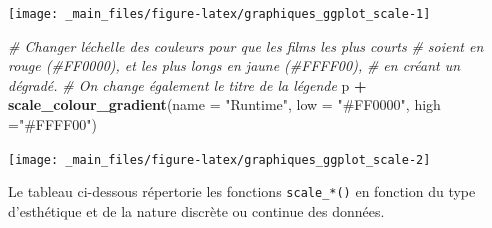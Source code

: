 \documentclass[
  11pt,
]{book}
\newenvironment{Shaded}{\begin{snugshade}}{\end{snugshade}}
\newcommand{\CommentTok}[1]{\textcolor[rgb]{0.56,0.35,0.01}{\textit{#1}}}
\newcommand{\DataTypeTok}[1]{\textcolor[rgb]{0.13,0.29,0.53}{#1}}
\newcommand{\KeywordTok}[1]{\textcolor[rgb]{0.13,0.29,0.53}{\textbf{#1}}}
\newcommand{\NormalTok}[1]{#1}
\newcommand{\OperatorTok}[1]{\textcolor[rgb]{0.81,0.36,0.00}{\textbf{#1}}}
\newcommand{\StringTok}[1]{\textcolor[rgb]{0.31,0.60,0.02}{#1}}
\numberwithin{equation}{section}
\numberwithin{countremarque}{section}
\begin{document}
\begin{center}\texttt{[image: \_main\_files/figure-latex/graphiques\_ggplot\_scale-1]} \end{center}

\begin{Shaded}
\begin{Highlighting}[]
\CommentTok{\# Changer l\textquotesingle{}échelle des couleurs pour que les films les plus courts}
\CommentTok{\# soient en rouge (\#FF0000), et les plus longs en jaune (\#FFFF00),}
\CommentTok{\# en créant un dégradé.}
\CommentTok{\# On change également le titre de la légende}
\NormalTok{p }\OperatorTok{+}\StringTok{ }\KeywordTok{scale\_colour\_gradient}\NormalTok{(}\DataTypeTok{name =} \StringTok{"Runtime"}\NormalTok{, }\DataTypeTok{low =} \StringTok{"\#FF0000"}\NormalTok{, }\DataTypeTok{high =}\StringTok{"\#FFFF00"}\NormalTok{)}
\end{Highlighting}
\end{Shaded}

\begin{center}\texttt{[image: \_main\_files/figure-latex/graphiques\_ggplot\_scale-2]} \end{center}

Le tableau ci-dessous répertorie les fonctions \texttt{scale\_*()} en fonction du type d'esthétique et de la nature discrète ou continue des données.
\end{document}
